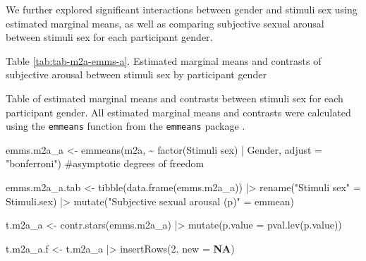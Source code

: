 \documentclass[
  bookmarksnumbered]{article}
\newenvironment{Shaded}{\begin{snugshade}}{\end{snugshade}}
\newcommand{\AttributeTok}[1]{\textcolor[rgb]{0.80,0.80,0.80}{#1}}
\newcommand{\CommentTok}[1]{\textcolor[rgb]{0.50,0.62,0.50}{#1}}
\newcommand{\ConstantTok}[1]{\textcolor[rgb]{0.86,0.64,0.64}{\textbf{#1}}}
\newcommand{\DecValTok}[1]{\textcolor[rgb]{0.86,0.86,0.80}{#1}}
\newcommand{\FunctionTok}[1]{\textcolor[rgb]{0.94,0.94,0.56}{#1}}
\newcommand{\NormalTok}[1]{\textcolor[rgb]{0.80,0.80,0.80}{#1}}
\newcommand{\OtherTok}[1]{\textcolor[rgb]{0.94,0.94,0.56}{#1}}
\newcommand{\SpecialCharTok}[1]{\textcolor[rgb]{0.86,0.64,0.64}{#1}}
\newcommand{\StringTok}[1]{\textcolor[rgb]{0.80,0.58,0.58}{#1}}
\begin{document}
We further explored significant interactions between gender and stimuli sex using estimated marginal means, as well as comparing subjective sexual arousal between stimuli sex for each participant gender.

Table \ref{tab:tab-m2a-emms-a}. Estimated marginal means and contrasts of subjective arousal between stimuli sex by participant gender

Table of estimated marginal means and contrasts between stimuli sex for each participant gender. All estimated marginal means and contrasts were calculated using the \texttt{emmeans} function from the \texttt{emmeans} package \autocite{emmeanscit}.

\begin{Shaded}
\begin{Highlighting}[]
\NormalTok{emms.m2a\_a }\OtherTok{\textless{}{-}} \FunctionTok{emmeans}\NormalTok{(m2a, }\SpecialCharTok{\textasciitilde{}} \FunctionTok{factor}\NormalTok{(}\StringTok{\textasciigrave{}}\AttributeTok{Stimuli sex}\StringTok{\textasciigrave{}}\NormalTok{) }\SpecialCharTok{|}\NormalTok{ Gender,}
                    \AttributeTok{adjust =} \StringTok{"bonferroni"}\NormalTok{) }\CommentTok{\#asymptotic degrees of freedom}

\NormalTok{emms.m2a\_a.tab }\OtherTok{\textless{}{-}} \FunctionTok{tibble}\NormalTok{(}\FunctionTok{data.frame}\NormalTok{(emms.m2a\_a)) }\SpecialCharTok{|\textgreater{}}
  \FunctionTok{rename}\NormalTok{(}\StringTok{"Stimuli sex"} \OtherTok{=}\NormalTok{ Stimuli.sex) }\SpecialCharTok{|\textgreater{}} 
  \FunctionTok{mutate}\NormalTok{(}\StringTok{"Subjective sexual arousal (p)"} \OtherTok{=}\NormalTok{ emmean)}

\NormalTok{t.m2a\_a }\OtherTok{\textless{}{-}} \FunctionTok{contr.stars}\NormalTok{(emms.m2a\_a) }\SpecialCharTok{|\textgreater{}} 
  \FunctionTok{mutate}\NormalTok{(}\AttributeTok{p.value =} \FunctionTok{pval.lev}\NormalTok{(p.value))}

\NormalTok{t.m2a\_a.f }\OtherTok{\textless{}{-}}\NormalTok{ t.m2a\_a }\SpecialCharTok{|\textgreater{}} 
  \FunctionTok{insertRows}\NormalTok{(}\DecValTok{2}\NormalTok{, }\AttributeTok{new =} \ConstantTok{NA}\NormalTok{)}


\end{Highlighting}
\end{Shaded}
\end{document}
